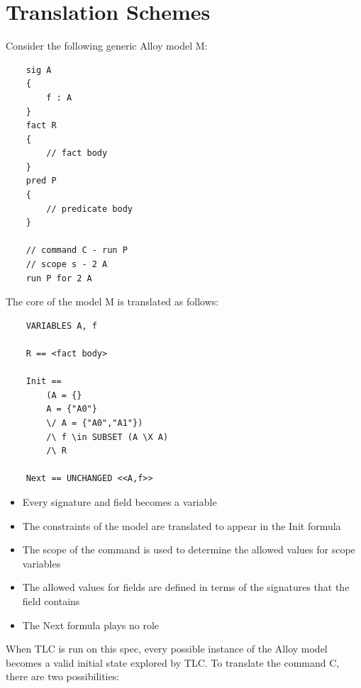 \section{Translation Schemes}

Consider the following generic Alloy model M:


\begin{lstlisting}
	sig A
	{
		f : A
	}
	fact R
	{
		// fact body
	}
	pred P 
	{
		// predicate body
	}

	// command C - run P
	// scope s - 2 A
	run P for 2 A

\end{lstlisting}

The core of the model M is translated as follows:

\begin{lstlisting}
	VARIABLES A, f

	R == <fact body>

	Init == 
		(A = {}
		A = {"A0"}
		\/ A = {"A0","A1"})
		/\ f \in SUBSET (A \X A)
		/\ R

	Next == UNCHANGED <<A,f>>

\end{lstlisting}



\begin{itemize}
	\item Every signature and field becomes a variable
	\item The constraints of the model are translated to appear in the Init formula
	\item The scope of the command is used to determine the allowed values for scope variables
	\item The allowed values for fields are defined in terms of the signatures that the field contains
	\item The Next formula plays no role
\end{itemize}

When TLC is run on this spec, every possible instance of the Alloy model becomes a valid initial state explored by TLC. To translate the command C, there are two possibilities:

\begin{lstlisting}

\end{lstlisting}

